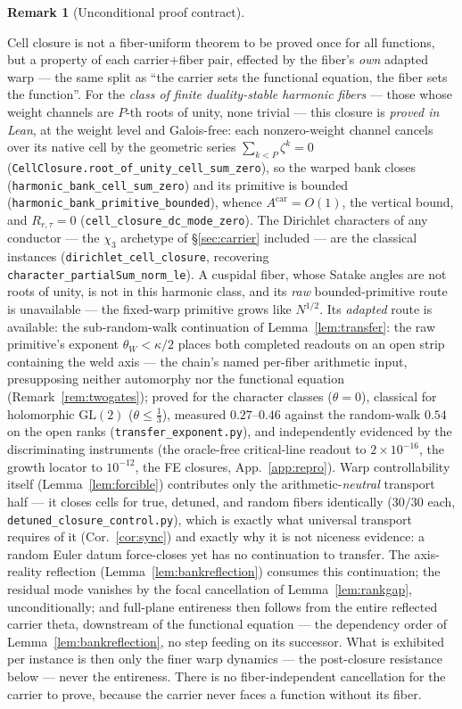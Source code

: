 \documentclass[11pt]{article}
\theoremstyle{definition}
\newtheorem{remark}[theorem]{Remark}
\begin{document}
\begin{remark}[Unconditional proof contract]
\begin{enumerate}
\noindent Cell closure is not a fiber-uniform theorem to be proved once for all functions, but a property
of each carrier$+$fiber pair, effected by the fiber's \emph{own} adapted warp --- the same split as ``the
carrier sets the functional equation, the fiber sets the function''. For the \emph{class of finite
duality-stable harmonic fibers} --- those whose weight channels are $P$-th roots of unity, none trivial ---
this closure is \emph{proved in Lean}, at the weight level and Galois-free: each nonzero-weight channel
cancels over its native cell by the geometric series $\sum_{k<P}\zeta^k=0$
(\texttt{CellClosure.root\_of\_unity\_cell\_sum\_zero}), so the warped bank closes
(\texttt{harmonic\_bank\_cell\_sum\_zero}) and its primitive is bounded
(\texttt{harmonic\_bank\_primitive\_bounded}), whence $A^{\mathrm{car}}=O(1)$, the vertical bound, and
$R_{r,\tau}=0$ (\texttt{cell\_closure\_dc\_mode\_zero}). The Dirichlet characters of any conductor ---
the $\chi_3$ archetype of \S\ref{sec:carrier} included --- are the classical instances
(\texttt{dirichlet\_cell\_closure}, recovering \texttt{character\_partialSum\_norm\_le}). A cuspidal fiber,
whose Satake angles are not roots of unity, is not in this harmonic class, and its \emph{raw} bounded-primitive
route is unavailable --- the fixed-warp primitive grows like $N^{1/2}$. Its \emph{adapted} route is available:
the sub-random-walk continuation of Lemma~\ref{lem:transfer}: the raw primitive's exponent
$\theta_W<\kappa/2$ places both completed readouts on an open strip containing the weld axis --- the chain's
named per-fiber arithmetic input, presupposing neither automorphy nor the functional equation
(Remark~\ref{rem:twogates}); proved for the character classes ($\theta=0$), classical for holomorphic
$\mathrm{GL}(2)$ ($\theta\le\tfrac13$), measured $0.27$--$0.46$ against the random-walk $0.54$ on the open
ranks (\texttt{transfer\_exponent.py}), and independently evidenced by the discriminating instruments (the
oracle-free critical-line readout to $2\times10^{-16}$, the growth locator to $10^{-12}$, the FE closures,
App.~\ref{app:repro}). Warp controllability itself (Lemma~\ref{lem:forcible}) contributes only the
arithmetic-\emph{neutral} transport half --- it closes cells for true, detuned, and random fibers identically
($30/30$ each, \texttt{detuned\_closure\_control.py}), which is exactly what universal transport requires of it
(Cor.~\ref{cor:sync}) and exactly why it is not niceness evidence: a random Euler datum force-closes yet has no
continuation to transfer. The axis-reality
reflection (Lemma~\ref{lem:bankreflection}) consumes this continuation; the residual mode vanishes by the focal
cancellation of Lemma~\ref{lem:rankgap}, unconditionally; and full-plane entireness then follows from the entire
reflected carrier theta, downstream of the functional equation --- the dependency order of
Lemma~\ref{lem:bankreflection}, no step feeding on its successor.
What is exhibited per instance is then only the finer warp dynamics --- the post-closure resistance below ---
never the entireness. There is no fiber-independent cancellation for the carrier to prove, because the
carrier never faces a function without its fiber.


\end{enumerate}
\end{remark}
\end{document}
